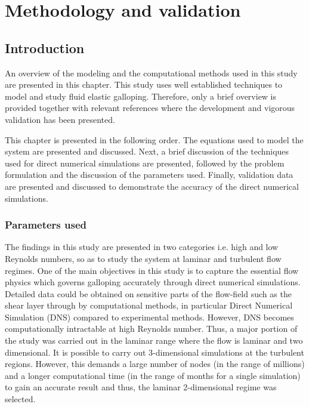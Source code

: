 
\chapter{Methodology and validation}

\section{Introduction}
 
An overview of the modeling and the computational methods used in this study are presented in this chapter. This study uses well established techniques to model and study fluid elastic galloping. Therefore, only a brief overview is provided together with relevant references where the development and vigorous validation has been presented.  

This chapter is presented in the following order. The equations used to model the system are presented and discussed. Next, a brief discussion of the techniques used for direct numerical simulations are presented, followed by the problem formulation and the discussion of the parameters used. Finally, validation data are presented and discussed to demonstrate the accuracy of the direct numerical simulations.


\subsection{Parameters used}

The findings in this study are presented in two categories i.e. high and low Reynolds numbers, so as to study the system at laminar and turbulent flow regimes. One of the main objectives in this study is to capture the essential flow physics which governs galloping accurately through direct numerical simulations. Detailed data could be obtained on sensitive parts of the flow-field such as the shear layer through by computational methods, in particular Direct Numerical Simulation (DNS) compared to experimental methods. However, DNS becomes computationally intractable at high Reynolds number. Thus, a major portion of the study was carried out in the laminar range where the flow is laminar and two dimensional. It is possible to carry out 3-dimensional simulations at the turbulent regions. However, this demands a large number of nodes (in the range of millions) and a longer computational time (in the range of months for a single simulation) to gain an accurate result and thus, the laminar 2-dimensional regime was selected.

